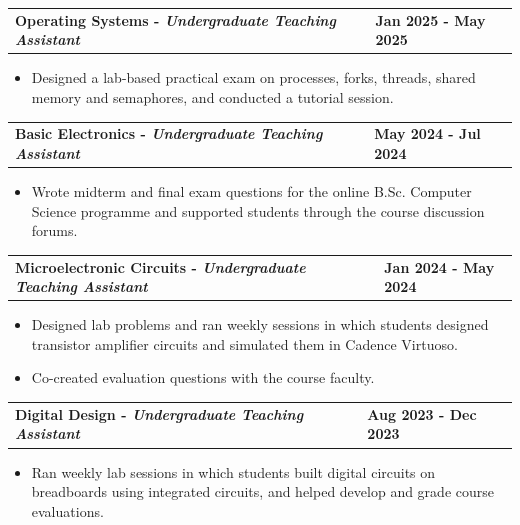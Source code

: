 \documentclass[letterpaper,11pt]{article}
\begin{document}
\begin{tabularx}{\linewidth}{ @{}l X@{} }
\textbf{Operating Systems - \textit{Undergraduate Teaching Assistant}} & \hfill \textbf{Jan 2025 - May 2025} \\
\end{tabularx}
\vspace{-1.2em}
\begin{itemize}
    \item[--] Designed a lab-based practical exam on processes, forks, threads, shared memory and semaphores, and conducted a tutorial session.
\end{itemize}
\vspace{-0.3em}

\begin{tabularx}{\linewidth}{ @{}l X@{} }
\textbf{Basic Electronics - \textit{Undergraduate Teaching Assistant}} & \hfill \textbf{May 2024 - Jul 2024} \\
\end{tabularx}
\vspace{-1.2em}
\begin{itemize}
    \item[--] Wrote midterm and final exam questions for the online B.Sc. Computer Science programme and supported students through the course discussion forums.
\end{itemize}
\vspace{-0.3em}

\begin{tabularx}{\linewidth}{ @{}l X@{} }
\textbf{Microelectronic Circuits - \textit{Undergraduate Teaching Assistant}} & \hfill \textbf{Jan 2024 - May 2024} \\
\end{tabularx}
\vspace{-1.2em}
\begin{itemize}
    \item[--] Designed lab problems and ran weekly sessions in which students designed transistor amplifier circuits and simulated them in Cadence Virtuoso. \vspace{-0.5em}
    \item[--] Co-created evaluation questions with the course faculty.
\end{itemize}
\vspace{-0.3em}

\begin{tabularx}{\linewidth}{ @{}l X@{} }
\textbf{Digital Design - \textit{Undergraduate Teaching Assistant}} & \hfill \textbf{Aug 2023 - Dec 2023} \\
\end{tabularx}
\vspace{-1.2em}
\begin{itemize}
    \item[--] Ran weekly lab sessions in which students built digital circuits on breadboards using integrated circuits, and helped develop and grade course evaluations.
\end{itemize}
\vspace{-0.3em}
\end{document}
